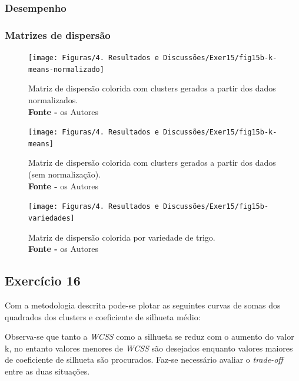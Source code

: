 %

\subsubsection{Desempenho}


\subsubsection{Matrizes de dispersão}
\begin{figure}[H]
    \centering
    \texttt{[image: Figuras/4. Resultados e Discussões/Exer15/fig15b-k-means-normalizado]}
    \caption{Matriz de dispersão colorida com clusters gerados a partir dos dados normalizados.\\ \textbf{Fonte -} os Autores}
    \label{fig: Matriz de dispersão colorida com clusters executados a partir dos dados normalizados.}
\end{figure}

\begin{figure}[H]
    \centering
    \texttt{[image: Figuras/4. Resultados e Discussões/Exer15/fig15b-k-means]}
    \caption{Matriz de dispersão colorida com clusters gerados a partir dos dados (sem normalização).\\ \textbf{Fonte -} os Autores}
    \label{fig: Matriz de dispersão colorida com clusters executados a partir dos dados (sem normalização).}
\end{figure}

\begin{figure}[H]
    \centering
    \texttt{[image: Figuras/4. Resultados e Discussões/Exer15/fig15b-variedades]}
    \caption{Matriz de dispersão colorida por variedade de trigo.\\ \textbf{Fonte -} os Autores}
    \label{fig: Matriz de dispersão colorida por variedade de trigo.}
\end{figure}


\subsection{Exercício 16}
Com a metodologia descrita pode-se plotar as seguintes curvas de somas dos quadrados dos clusters e coeficiente de silhueta médio:

Observa-se que tanto a \textit{WCSS} como a silhueta se reduz com o aumento do valor k, no entanto valores menores de \textit{WCSS} são desejados enquanto valores maiores de coeficiente de silhueta são procurados. Faz-se necessário avaliar o \textit{trade-off} entre as duas situações.


